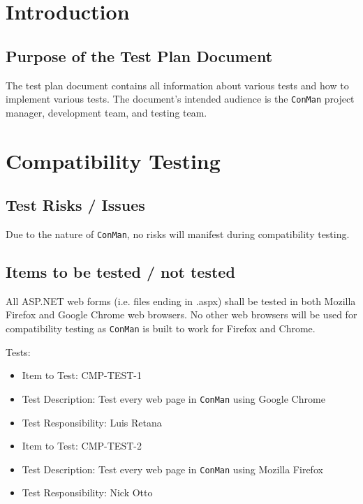 \documentclass{article}
\begin{document}

\normalsize

\newpage
\tableofcontents

\newpage
\section{Introduction}
\subsection{Purpose of the Test Plan Document}
The test plan document contains all information about various tests and 
how to implement various tests. The document's intended audience is the 
\texttt{ConMan} project manager, development team, and testing team.

\newpage
\section{Compatibility Testing}
\subsection{Test Risks / Issues}
Due to the nature of \texttt{ConMan}, no risks will manifest during compatibility 
testing. 

\subsection{Items to be tested / not tested}
All ASP.NET web forms (i.e. files ending in .aspx) shall be tested in both 
Mozilla Firefox and Google Chrome web browsers. No other web browsers will 
be used for compatibility testing as \texttt{ConMan} is built to work for Firefox 
and Chrome.\newline

Tests:
\begin{itemize}
\item Item to Test: CMP-TEST-1
\item Test Description: Test every web page in \texttt{ConMan} using Google Chrome
\item Test Responsibility: Luis Retana
\end{itemize}
\begin{itemize}
\item Item to Test: CMP-TEST-2
\item Test Description: Test every web page in \texttt{ConMan} using Mozilla Firefox
\item Test Responsibility: Nick Otto
\end{itemize}
\end{document}
